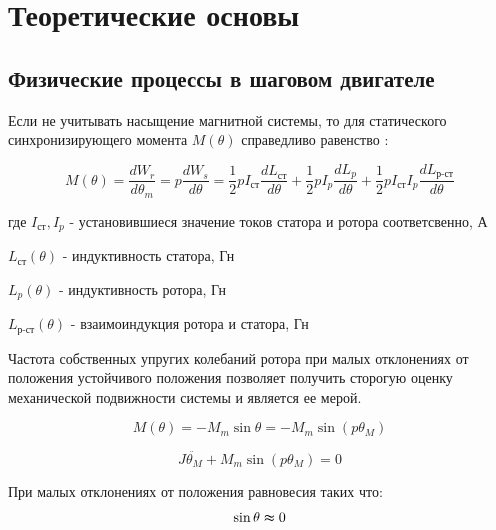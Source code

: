\newpage
\section{Теоретические основы}



\newpage
\subsection{Физические процессы в шаговом двигателе}
Если не учитывать насыщение магнитной системы, то для статического синхронизирующего
момента $M(\theta)$ справедливо равенство \cite[стр. 82]{Chilikin}:

\begin{equation}
\label{step_motor_torque_common}
    M(\theta)
    = \frac{dW_r}{d\theta_m}
    = p \frac{dW_s}{d\theta}
    = \frac{1}{2} p I_{\text{ст}} \frac{dL_{\text{ст}}}{d\theta}
        + \frac{1}{2} p I_{p} \frac{dL_{p}}{d\theta}
        + \frac{1}{2} p I_{\text{ст}} I_{p} \frac{dL_{\text{р-ст}}}{d\theta}
\end{equation}

где $I_{\text{ст}}, I_{p}$ - установившиеся значение токов статора и ротора соответсвенно, А

$L_{\text{ст}}(\theta)$ - индуктивность статора, Гн

$L_{p}(\theta)$ - индуктивность ротора, Гн

$L_{\text{р-ст}}(\theta)$ - взаимоиндукция ротора и статора, Гн
\newline

Частота собственных упругих колебаний ротора \cite[гл 3.1]{Chilikin} при малых
отклонениях от положения устойчивого положения позволяет получить сторогую оценку
механической подвижности системы и является ее мерой.

\begin{equation}
\label{step_motor_torque_without_load_and_with_unstable_rotor}
    M(\theta)
    = - M_{m} \sin{\theta}
    = - M_{m} \sin({p \theta_{M}})
\end{equation}

\begin{equation}
\label{step_motor_dynamic_move_equation}
    J \ddot{ \theta_{M} } + M_{m} \sin({p \theta_{M} } ) = 0
\end{equation}

При малых отклонениях от положения равновесия таких что:
\begin{equation}
    \sin{\theta} \thickapprox 0
\end{equation}

